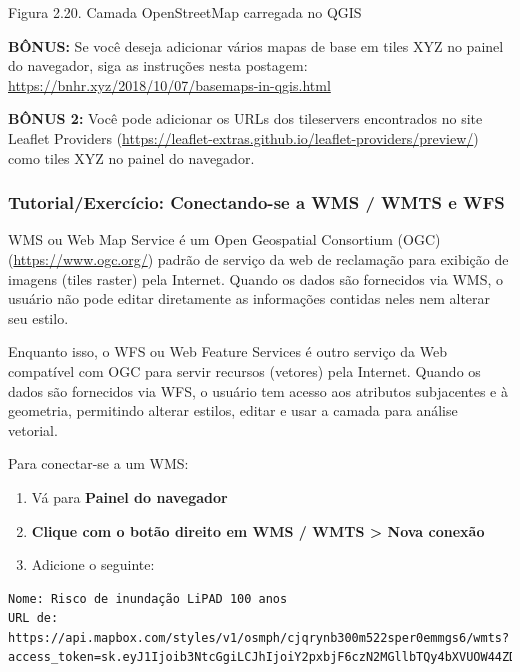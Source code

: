 \documentclass[
]{krantz}
\providecommand{\tightlist}{%
  \setlength{\itemsep}{0pt}\setlength{\parskip}{0pt}}
\begin{document}
Figura 2.20. Camada OpenStreetMap carregada no QGIS

\textbf{BÔNUS:} Se você deseja adicionar vários mapas de base em tiles XYZ no painel do navegador, siga as instruções nesta postagem: \url{https://bnhr.xyz/2018/10/07/basemaps-in-qgis.html}

\textbf{BÔNUS 2:} Você pode adicionar os URLs dos tileservers encontrados no site Leaflet Providers (\href{https://leaflet-\%20extras.github.io/leaflet-providers/preview/}{https://leaflet-extras.github.io/leaflet-providers/preview/}) como tiles XYZ no painel do navegador.

\hypertarget{tutorialexercuxedcio-conectando-se-a-wms-wmts-e-wfs}{%
\subsubsection{\texorpdfstring{\textbf{Tutorial/Exercício: Conectando-se a WMS / WMTS e WFS}}{Tutorial/Exercício: Conectando-se a WMS / WMTS e WFS}}\label{tutorialexercuxedcio-conectando-se-a-wms-wmts-e-wfs}}

WMS ou Web Map Service é um Open Geospatial Consortium (OGC) (\href{https://www\%20.ogc.org\%20/}{https://www.ogc.org/}) padrão de serviço da web de reclamação para exibição de imagens (tiles raster) pela Internet. Quando os dados são fornecidos via WMS, o usuário não pode editar diretamente as informações contidas neles nem alterar seu estilo.

Enquanto isso, o WFS ou Web Feature Services é outro serviço da Web compatível com OGC para servir recursos (vetores) pela Internet. Quando os dados são fornecidos via WFS, o usuário tem acesso aos atributos subjacentes e à geometria, permitindo alterar estilos, editar e usar a camada para análise vetorial.

Para conectar-se a um WMS:

\begin{enumerate}
\def\labelenumi{\arabic{enumi}.}
\tightlist
\item
  Vá para \textbf{Painel do navegador}
\item
  \textbf{Clique com o botão direito em WMS / WMTS \textgreater{} Nova conexão}
\item
  Adicione o seguinte:
\end{enumerate}

\begin{verbatim}
Nome: Risco de inundação LiPAD 100 anos
URL de: https://api.mapbox.com/styles/v1/osmph/cjqrynb300m522sper0emmgs6/wmts?access_token=sk.eyJ1Ijoib3NtcGgiLCJhIjoiY2pxbjF6czN2MGllbTQy4bXVUOW44ZDlMS
\end{verbatim}
\end{document}
